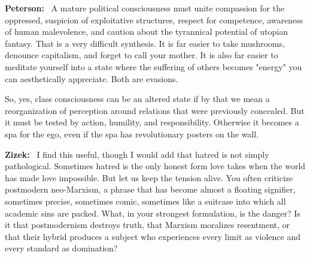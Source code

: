 \documentclass[a4paper,11pt]{article}
\newenvironment{question}{\par\noindent\color{ALIUSRed}\textbf{Zizek:}\ }{\par}
\newenvironment{answer}{\par\noindent\color{black}\textbf{Peterson:}\ }{\par}
\begin{document}
\begin{answer}
A mature political consciousness must unite compassion for the oppressed, suspicion of exploitative structures, respect for competence, awareness of human malevolence, and caution about the tyrannical potential of utopian fantasy. That is a very difficult synthesis. It is far easier to take mushrooms, denounce capitalism, and forget to call your mother. It is also far easier to meditate yourself into a state where the suffering of others becomes "energy" you can aesthetically appreciate. Both are evasions.

So, yes, class consciousness can be an altered state if by that we mean a reorganization of perception around relations that were previously concealed. But it must be tested by action, humility, and responsibility. Otherwise it becomes a spa for the ego, even if the spa has revolutionary posters on the wall.
\end{answer}

\begin{question}
I find this useful, though I would add that hatred is not simply pathological. Sometimes hatred is the only honest form love takes when the world has made love impossible. But let us keep the tension alive. You often criticize postmodern neo-Marxism, a phrase that has become almost a floating signifier, sometimes precise, sometimes comic, sometimes like a suitcase into which all academic sins are packed. What, in your strongest formulation, is the danger? Is it that postmodernism destroys truth, that Marxism moralizes resentment, or that their hybrid produces a subject who experiences every limit as violence and every standard as domination?
\end{question}
\end{document}
